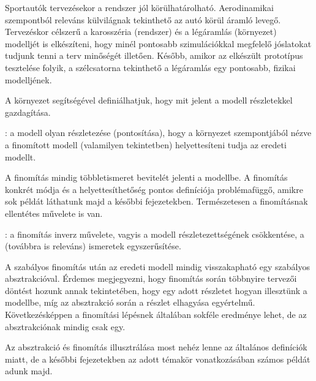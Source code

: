 \begin{pelda}
	Sportautók tervezésekor a rendszer jól körülhatárolható. Aerodinamikai szempontból releváns külvilágnak tekinthető az autó körül áramló levegő. Tervezéskor célszerű a karosszéria (rendszer) és a légáramlás (környezet) modelljét is elkészíteni, hogy minél pontosabb szimulációkkal megfelelő jóslatokat tudjunk tenni a terv minőségét illetően. Később, amikor az elkészült prototípus tesztelése folyik, a szélcsatorna tekinthető a légáramlás egy pontosabb, fizikai modelljének.
\end{pelda}

A környezet segítségével definiálhatjuk, hogy mit jelent a modell részletekkel gazdagítása.

\begin{definicio}
	: a modell olyan részletezése (pontosítása), hogy a környezet szempontjából nézve a finomított modell (valamilyen tekintetben) helyettesíteni tudja az eredeti modellt.
\end{definicio}

A finomítás mindig többletismeret bevitelét jelenti a modellbe. A finomítás konkrét módja és a helyettesíthetőség pontos definíciója problémafüggő, amikre sok példát láthatunk majd a későbbi fejezetekben. Természetesen a finomításnak ellentétes művelete is van.

\begin{definicio}
	: a finomítás inverz művelete, vagyis a modell részletezettségének csökkentése, a (továbbra is releváns) ismeretek egyszerűsítése.
\end{definicio}

A szabályos finomítás után az eredeti modell mindig visszakapható egy szabályos absztrakcióval. Érdemes megjegyezni, hogy finomítás során többnyire tervezői döntést hozunk annak tekintetében, hogy egy adott részletet hogyan illesztünk a modellbe, míg az absztrakció során a részlet elhagyása egyértelmű. Következésképpen a finomítási lépésnek általában sokféle eredménye lehet, de az absztrakciónak mindig csak egy.

\begin{tipp}
	Az absztrakció és finomítás illusztrálása most nehéz lenne az általános definíciók miatt, de a későbbi fejezetekben az adott témakör vonatkozásában számos példát adunk majd.
\end{tipp}